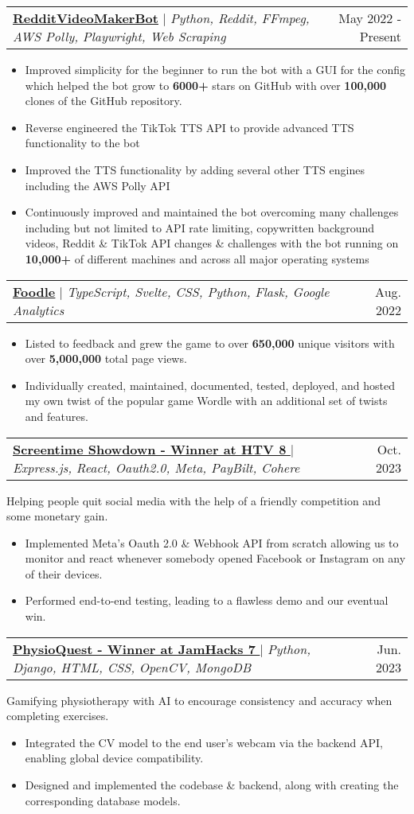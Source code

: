\documentclass[letterpaper,11pt]{article}
\makeatletter
\newcommand{\resumeItem}[1]{
    \item\small{
            {#1 \vspace{-2pt}}
    }
}
\newcommand{\resumeProjectHeading}[2]{
    \item
    \begin{tabular*}{0.97\textwidth}{l@{\extracolsep{\fill}}r}
        \small#1 & #2 \\
    \end{tabular*}\vspace{-7pt}
}
\newcommand{\resumeProjectHeadingWithDescription}[3]{
    \item
    \begin{tabular*}{0.97\textwidth}{l@{\extracolsep{\fill}}r}
        \small#1 & #2 \\
    \end{tabular*}
    \vspace{-7pt}
    \small{#3}
}
\newcommand{\resumeItemListStart}{\begin{itemize}}
\newcommand{\resumeItemListEnd}{\end{itemize}\vspace{-5pt}}
\makeatother
\begin{document}
\resumeProjectHeading
{\underline{\href{https://github.com/elebumm/RedditVideoMakerBot}{\textbf{RedditVideoMakerBot}}} $|$ \emph{Python, Reddit, FFmpeg, AWS Polly, Playwright, Web Scraping}} {May 2022 - Present}
\resumeItemListStart
\resumeItem{Improved simplicity for the beginner to run the bot with a GUI for the config which helped the bot grow to
\textbf{6000+} stars on GitHub with over \textbf{100,000} clones of the GitHub repository.}
\resumeItem{Reverse engineered the TikTok TTS API to provide advanced TTS functionality to the bot}
\resumeItem{Improved the TTS functionality by adding several other TTS engines including the AWS Polly API}
\resumeItem{Continuously improved and maintained the bot overcoming many challenges including but not limited to API
rate limiting, copywritten background videos, Reddit \& TikTok API changes \& challenges with the bot running
on \textbf{10,000+} of different machines and across all major operating systems}
\resumeItemListEnd

\resumeProjectHeading
{\underline{\href{https://jasoncameron.dev/foodle}{\textbf{Foodle}}} $|$ \emph{TypeScript, Svelte, CSS, Python, Flask, Google Analytics}} {Aug. 2022}
\resumeItemListStart
\resumeItem{Listed to feedback and grew the game to over \textbf{650,000} unique visitors with over \textbf{5,000,000} total page views.}
\resumeItem{Individually created, maintained, documented, tested, deployed, and hosted my own twist of the popular
game Wordle with an additional set of twists and features.}
\resumeItemListEnd

\resumeProjectHeadingWithDescription
{\underline{\href{https://devpost.com/software/screentime-showdown}{\textbf{Screentime Showdown - Winner at HTV 8 }}} $|$ \emph{Express.js, React, Oauth2.0, Meta, PayBilt, Cohere}}{Oct. 2023}
{Helping people quit social media with the help of a friendly competition and some monetary gain. }
\resumeItemListStart
\resumeItem{Implemented Meta’s Oauth 2.0 \& Webhook API from scratch allowing us to monitor and react whenever somebody opened Facebook or Instagram on any of their devices.}
\resumeItem{Performed end-to-end testing, leading to a flawless demo and our eventual win.}
\resumeItemListEnd


\resumeProjectHeadingWithDescription
{\underline{\href{https://devpost.com/software/physioquest}{\textbf{PhysioQuest - Winner at JamHacks 7 }}} $|$ \emph{Python, Django, HTML, CSS, OpenCV, MongoDB}} {Jun. 2023}
{Gamifying physiotherapy with AI to encourage consistency and accuracy when completing exercises. }
\resumeItemListStart
\resumeItem{Integrated the CV model to the end user’s webcam via the backend API, enabling global device compatibility.}
\resumeItem{Designed and implemented the codebase \& backend, along with creating the corresponding database models.}
\resumeItemListEnd
\end{document}
